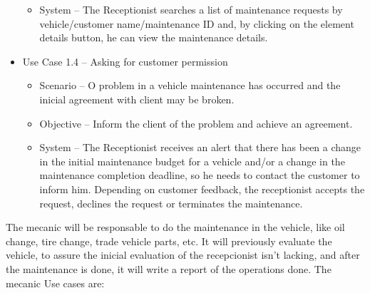 \begin{itemize}
\begin{itemize}
      \item System –  The Receptionist searches a list of maintenance requests by vehicle/customer name/maintenance ID and, by clicking on the element details button, he can view the maintenance details.
    \end{itemize}
    \item Use Case 1.4 – Asking for customer permission
    \begin{itemize}
      \item Scenario – O problem in a vehicle maintenance has occurred and the inicial agreement with client may be broken.
      \item Objective – Inform the client of the problem and achieve an agreement.
      \item System – The Receptionist receives an alert that there has been a change in the initial maintenance budget for a vehicle and/or a change in the maintenance completion deadline, so he needs to contact the customer to inform him. Depending on customer feedback, the receptionist accepts the request, declines the request or terminates the maintenance.
    \end{itemize}
  \end{itemize}  
  \hfill \break


  The mecanic will be responsable to do the maintenance in the vehicle, like oil change, tire change, trade vehicle parts, etc. 
  It will previously evaluate the vehicle, to assure the inicial evaluation of the recepcionist isn't lacking, and after the maintenance is done, it will write a report of the operations done. 
  The mecanic Use cases are:

